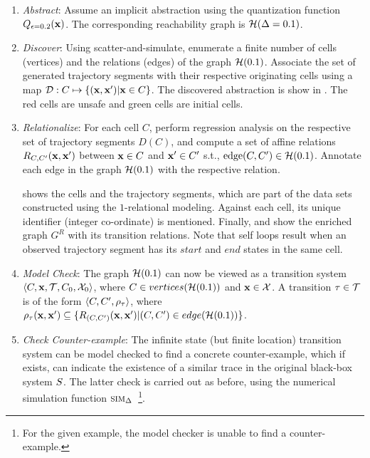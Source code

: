 \begin{enumerate}
\item{\emph{Abstract}}: Assume an implicit abstraction using the quantization
        function $Q_{\epsilon=0.2}(\mathbf{x})$. The corresponding reachability
    graph is $\mathcal{H}(\Delta=0.1)$.
\item{\emph{Discover}}: Using scatter-and-simulate, enumerate a finite number
    of cells (vertices) and the relations (edges) of the graph
    $\mathcal{H}(0.1)$. Associate the set of generated trajectory
    segments with their respective originating cells using a map $\mathcal{D}:C
        \mapsto \{(\mathbf{x},\mathbf{x}') |\mathbf{x} \in C\}$. The discovered
    abstraction is show in . The red cells
    are unsafe and green cells are initial cells.
\item{\emph{Relationalize}}: For each cell $C$, perform regression analysis on
    the respective set of trajectory segments $D(C)$, and compute a
    set of affine relations $R_{C,C'}(\mathbf{x},\mathbf{x}')$ between $\mathbf{x} \in C$ and $\mathbf{x}'
    \in C'$ s.t., $\text{edge} (C,C') \in \mathcal{H}(0.1)$. Annotate
    each edge in the graph $\mathcal{H}(0.1)$ with the respective
    relation.

     shows the cells and the trajectory segments, which
    are part of the data sets constructed using the $1$-relational
    modeling. Against each cell, its unique identifier (integer
    co-ordinate) is mentioned.  Finally,  and
     show the enriched graph $G^R$ with its transition
    relations. Note that self loops result when an observed trajectory
    segment has its $start$ and $end$ states in the same cell.

\item{\emph{Model Check}}: The graph $\mathcal{H}(0.1)$ can now be viewed as a
    transition system $\left\langle C,\mathbf{x},\mathcal{T},C_0,\mathcal{X}_0 \right \rangle$,
    where $C \in vertices(\mathcal{H}(0.1))$ and $\mathbf{x} \in
    \mathcal{X}$. A transition $\tau \in \mathcal{T}$ is of the form
    $\left\langle C, C',\rho_{\tau} \right \rangle$, where $\rho_{\tau}(\mathbf{x},\mathbf{x}')
    \subseteq \{R_{(C,C')}(\mathbf{x},\mathbf{x}') |( C,C') \in
    edge(\mathcal{H}(0.1))\}$.
\item{\emph{Check Counter-example}}: The infinite state (but finite location) transition system can
    be model checked to find a concrete counter-example, which if
    exists, can indicate the existence of a similar trace in the
    original black-box system $S$. The latter check is carried
    out as before, using the numerical simulation function
        $\mbox{\sc sim}_\Delta$~\footnote{For the given example, the model checker is unable to
        find a counter-example.}.
\end{enumerate}

